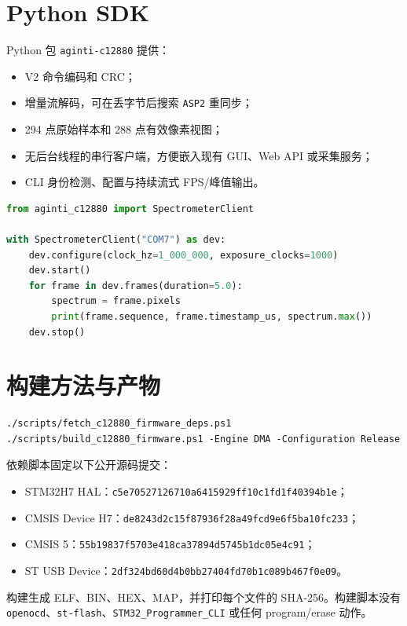 \documentclass[UTF8,fontset=windows,11pt]{ctexart}
\newcommand{\code}[1]{\texttt{#1}}
\begin{document}
\section{Python SDK}

Python 包 \code{aginti-c12880} 提供：
\begin{itemize}
  \item V2 命令编码和 CRC；
  \item 增量流解码，可在丢字节后搜索 \code{ASP2} 重同步；
  \item 294 点原始样本和 288 点有效像素视图；
  \item 无后台线程的串行客户端，方便嵌入现有 GUI、Web API 或采集服务；
  \item CLI 身份检测、配置与持续流式 FPS/峰值输出。
\end{itemize}

\begin{lstlisting}[style=code,language=Python]
from aginti_c12880 import SpectrometerClient

with SpectrometerClient("COM7") as dev:
    dev.configure(clock_hz=1_000_000, exposure_clocks=1000)
    dev.start()
    for frame in dev.frames(duration=5.0):
        spectrum = frame.pixels
        print(frame.sequence, frame.timestamp_us, spectrum.max())
    dev.stop()
\end{lstlisting}

\section{构建方法与产物}

\begin{lstlisting}[style=code]
./scripts/fetch_c12880_firmware_deps.ps1
./scripts/build_c12880_firmware.ps1 -Engine DMA -Configuration Release
\end{lstlisting}

依赖脚本固定以下公开源码提交：
\begin{itemize}
  \item STM32H7 HAL：\code{c5e70527126710a6415929ff10c1fd1f40394b1e}；
  \item CMSIS Device H7：\code{de8243d2c15f87936f28a49fcd9e6f5ba10fc233}；
  \item CMSIS 5：\code{55b19837f5703e418ca37894d5745b1dc05e4c91}；
  \item ST USB Device：\code{2df324bd60d4b0bb27404fd70b1c089b467f0e09}。
\end{itemize}

构建生成 ELF、BIN、HEX、MAP，并打印每个文件的 SHA-256。构建脚本没有
\code{openocd}、\code{st-flash}、\code{STM32\_Programmer\_CLI} 或任何 program/erase
动作。
\end{document}
